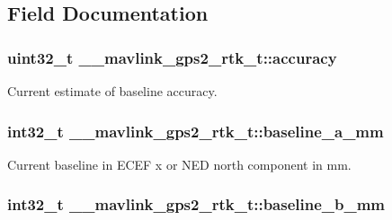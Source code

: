 \subsection{Field Documentation}
\hypertarget{struct____mavlink__gps2__rtk__t_a342d3d2172791e25e40b9c18f9519929}{
\subsubsection[{accuracy}]{\setlength{\rightskip}{0pt plus 5cm}uint32\+\_\+t \+\_\+\+\_\+mavlink\+\_\+gps2\+\_\+rtk\+\_\+t\+::accuracy}}\label{struct____mavlink__gps2__rtk__t_a342d3d2172791e25e40b9c18f9519929}


Current estimate of baseline accuracy. 

\hypertarget{struct____mavlink__gps2__rtk__t_a92813d61c91e581703c6fb44e01b4c73}{
\subsubsection[{baseline\+\_\+a\+\_\+mm}]{\setlength{\rightskip}{0pt plus 5cm}int32\+\_\+t \+\_\+\+\_\+mavlink\+\_\+gps2\+\_\+rtk\+\_\+t\+::baseline\+\_\+a\+\_\+mm}}\label{struct____mavlink__gps2__rtk__t_a92813d61c91e581703c6fb44e01b4c73}


Current baseline in E\+C\+E\+F x or N\+E\+D north component in mm. 

\hypertarget{struct____mavlink__gps2__rtk__t_acda4ef72fe20e914e4a27e6906c5f826}{
\subsubsection[{baseline\+\_\+b\+\_\+mm}]{\setlength{\rightskip}{0pt plus 5cm}int32\+\_\+t \+\_\+\+\_\+mavlink\+\_\+gps2\+\_\+rtk\+\_\+t\+::baseline\+\_\+b\+\_\+mm}}\label{struct____mavlink__gps2__rtk__t_acda4ef72fe20e914e4a27e6906c5f826}



